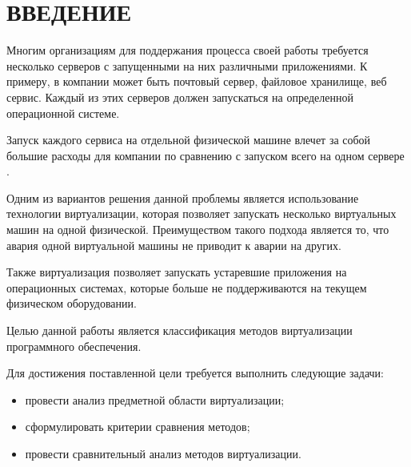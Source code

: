 \chapter*{ВВЕДЕНИЕ}

Многим организациям для поддержания процесса своей работы требуется несколько серверов с запущенными на них различными приложениями.
К примеру, в компании может быть почтовый сервер, файловое хранилище, веб сервис.
Каждый из этих серверов должен запускаться на определенной операционной системе.

Запуск каждого сервиса на отдельной физической машине влечет за собой большие расходы для компании по сравнению с запуском всего на одном сервере \cite{tanenbaumOS}.

Одним из вариантов решения данной проблемы является использование технологии виртуализации, которая позволяет запускать несколько виртуальных машин на одной физической.
Преимуществом такого подхода является то, что авария одной виртуальной машины не приводит к аварии на других.

Также виртуализация позволяет запускать устаревшие приложения на операционных системах, которые больше не поддерживаются на текущем физическом оборудовании.

Целью данной работы является классификация методов виртуализации программного обеспечения.

Для достижения поставленной цели требуется выполнить следующие задачи:
\begin{itemize}
	\item провести анализ предметной области виртуализации;
	\item сформулировать критерии сравнения методов;
	\item провести сравнительный анализ методов виртуализации.
\end{itemize}